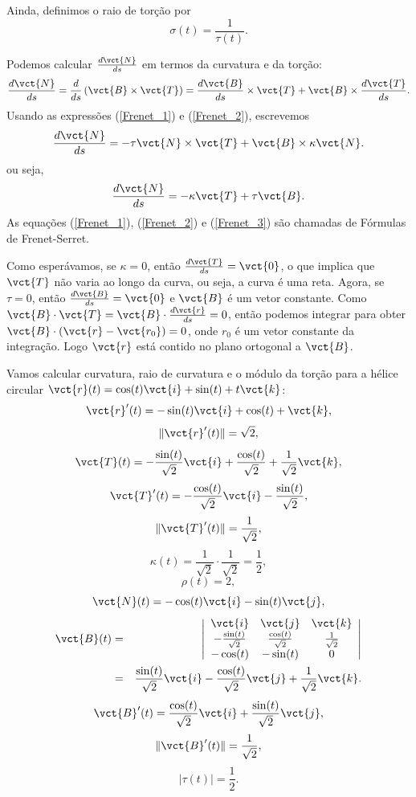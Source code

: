Ainda, definimos o raio de torção por
$$
\sigma(t)=\frac{1}{\tau(t)}.
$$

Podemos calcular $\frac{d\vct{N}}{ds}$ em termos da curvatura e da torção:
\begin{equation*}
\frac{d\vct{N}}{ds}=\frac{d}{ds}\left(\vct{B}\times\vct{T}\right)=\frac{d\vct{B}}{ds}\times \vct{T}+\vct{B}\times\frac{d\vct{T}}{ds}.
\end{equation*}
Usando as expressões (\ref{Frenet_1}) e (\ref{Frenet_2}), escrevemos
\begin{equation*}
\frac{d\vct{N}}{ds}=-\tau\vct{N} \times \vct{T}+\vct{B}\times \kappa \vct{N}.
\end{equation*}
ou seja,
\begin{equation}{\label{Frenet_3}}
\frac{d\vct{N}}{ds}=-\kappa \vct{T}+\tau \vct{B}.
\end{equation}
As equações (\ref{Frenet_1}), (\ref{Frenet_2}) e (\ref{Frenet_3}) são chamadas de Fórmulas de Frenet-Serret.

Como esperávamos, se $\kappa=0$, então $\frac{d\vct{T}}{ds}=\vct{0}$, o que implica que $\vct{T}$ não varia ao longo da curva, ou seja, a curva é uma reta. Agora, se $\tau=0$, então $\frac{d\vct{B}}{ds}=\vct{0}$ e $\vct{B}$ é um vetor constante. Como $\vct{B}\cdot \vct{T}=\vct{B}\cdot \frac{d\vct{r}}{ds}=0$, então podemos integrar para obter $\vct{B}\cdot (\vct{r}-\vct{r_0})=0$, onde $r_0$ é um vetor constante da integração. Logo $\vct{r}$ está contido no plano ortogonal a $\vct{B}$.



\begin{ex} Vamos calcular curvatura, raio de curvatura e o módulo da torção para a hélice circular $\vct{r}(t)=\cos(t)\vct{i}+\sin(t)+t\vct{k}$:
$$
\vct{r}'(t)=-\sin(t)\vct{i}+\cos(t)+\vct{k},
$$
$$
\|\vct{r}'(t)\|=\sqrt{2},
$$
$$
\vct{T}(t)=-\frac{\sin(t)}{\sqrt{2}}\vct{i}+\frac{\cos(t)}{\sqrt{2}}+\frac{1}{\sqrt{2}}\vct{k},
$$
$$
\vct{T}'(t)=-\frac{\cos(t)}{\sqrt{2}}\vct{i}-\frac{\sin(t)}{\sqrt{2}},
$$
$$
\|\vct{T}'(t)\|=\frac{1}{\sqrt{2}},
$$
$$
\kappa(t)=\frac{1}{\sqrt{2}}\cdot \frac{1}{\sqrt{2}}=\frac{1}{2},
$$
$$
\rho(t)=2,
$$
$$
\vct{N}(t)=-\cos(t)\vct{i}-\sin(t)\vct{j},
$$
\begin{eqnarray*}
\vct{B}(t)&=&\left|\begin{array}{ccc}\vct{i}&\vct{j}&\vct{k}\\-\frac{\sin(t)}{\sqrt{2}}&\frac{\cos(t)}{\sqrt{2}}&\frac{1}{\sqrt{2}}\\-\cos(t)&-\sin(t)&0\end{array}\right|\\
&=&\frac{\sin(t)}{\sqrt{2}}\vct{i}-\frac{\cos(t)}{\sqrt{2}}\vct{j}+\frac{1}{\sqrt{2}}\vct{k}.
\end{eqnarray*}
$$
\vct{B}'(t)=\frac{\cos(t)}{\sqrt{2}}\vct{i}+\frac{\sin(t)}{\sqrt{2}}\vct{j},
$$
$$
\|\vct{B}'(t)\|=\frac{1}{\sqrt{2}},
$$
$$
|\tau(t)|=\frac{1}{2}.
$$
\end{ex}

